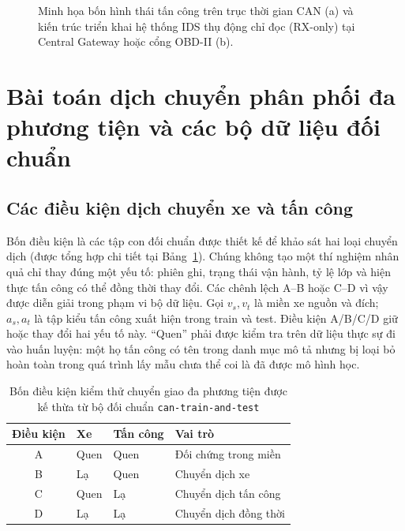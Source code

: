 \documentclass[12pt, a4paper, reqno, oneside]{book}
\begin{document}
\begin{figure}[htbp]
\caption[Bốn hình thái tấn công CAN và kiến trúc IDS thụ động]{Minh họa bốn hình thái tấn công trên trục thời gian CAN (a) và kiến trúc triển khai hệ thống IDS thụ động chỉ đọc (RX-only) tại Central Gateway hoặc cổng OBD-II (b).}\label{fig:attack-passive-ids}
\end{figure}

\section{Bài toán dịch chuyển phân phối đa phương tiện và các bộ dữ liệu đối chuẩn}
\subsection{Các điều kiện dịch chuyển xe và tấn công}
Bốn điều kiện là các tập con đối chuẩn được thiết kế để khảo sát hai loại chuyển dịch (được tổng hợp chi tiết tại Bảng~\ref{tab:conditions}). Chúng không tạo một thí nghiệm nhân quả chỉ thay đúng một yếu tố: phiên ghi, trạng thái vận hành, tỷ lệ lớp và hiện thực tấn công có thể đồng thời thay đổi. Các chênh lệch A--B hoặc C--D vì vậy được diễn giải trong phạm vi bộ dữ liệu.
Gọi $v_s,v_t$ là miền xe nguồn và đích; $a_s,a_t$ là tập kiểu tấn công xuất hiện trong train và test. Điều kiện A/B/C/D giữ hoặc thay đổi hai yếu tố này. ``Quen'' phải được kiểm tra trên dữ liệu thực sự đi vào huấn luyện: một họ tấn công có tên trong danh mục mô tả nhưng bị loại bỏ hoàn toàn trong quá trình lấy mẫu chưa thể coi là đã được mô hình học.

\begin{table}[htbp]\centering
\caption[Bốn điều kiện kiểm thử chuyển giao đa phương tiện]{Bốn điều kiện kiểm thử chuyển giao đa phương tiện được kế thừa từ bộ đối chuẩn \texttt{can-train-and-test}}\label{tab:conditions}
\begin{tabular}{clll}\toprule Điều kiện & Xe & Tấn công & Vai trò\\\midrule
A & Quen & Quen & Đối chứng trong miền\\
B & Lạ & Quen & Chuyển dịch xe\\
C & Quen & Lạ & Chuyển dịch tấn công\\
D & Lạ & Lạ & Chuyển dịch đồng thời\\\bottomrule\end{tabular}
\end{table}
\end{document}
